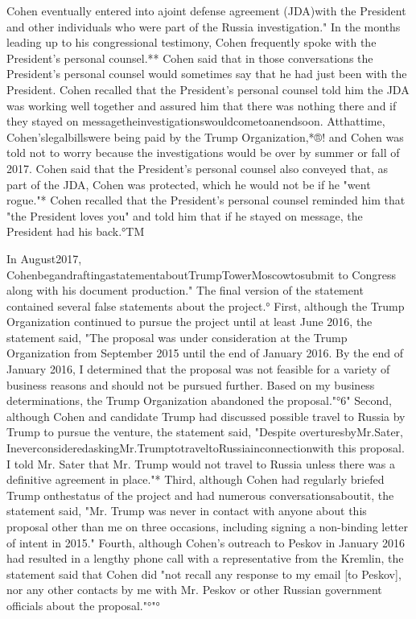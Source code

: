 Cohen eventually entered into ajoint defense agreement (JDA)with the President and other individuals who were part of the Russia investigation."
In the months leading up to his congressional testimony, Cohen frequently spoke with the President's personal counsel.**
Cohen said that in those conversations the President's personal counsel would sometimes say that he had just been with the President.
Cohen recalled that the President's personal counsel told him the JDA was working well together and assured him that there was nothing there and if they stayed on messagetheinvestigationswouldcometoanendsoon.
Atthattime, Cohen'slegalbillswere being paid by the Trump Organization,*®! and Cohen was told not to worry because the investigations would be over by summer or fall of 2017.
Cohen said that the President's personal counsel also conveyed that, as part of the JDA, Cohen was protected, which he would not be if he "went rogue."*
Cohen recalled that the President's personal counsel reminded him that "the President loves you" and told him that if he stayed on message, the President had his back.°TM

In August2017, CohenbegandraftingastatementaboutTrumpTowerMoscowtosubmit to Congress along with his document production."
The final version of the statement contained several false statements about the project.°
First, although the Trump Organization continued to pursue the project until at least June 2016, the statement said, "The proposal was under consideration at the Trump Organization from September 2015 until the end of January 2016.
By the end of January 2016, I determined that the proposal was not feasible for a variety of business reasons and should not be pursued further.
Based on my business determinations, the Trump Organization abandoned the proposal."°6"
Second, although Cohen and candidate Trump had discussed possible travel to Russia by Trump to pursue the venture, the statement said, "Despite overturesbyMr.Sater, IneverconsideredaskingMr.TrumptotraveltoRussiainconnectionwith this proposal.
I told Mr. Sater that Mr. Trump would not travel to Russia unless there was a definitive agreement in place."*
Third, although Cohen had regularly briefed Trump onthestatus of the project and had numerous conversationsaboutit, the statement said, "Mr. Trump was never in contact with anyone about this proposal other than me on three occasions, including signing a non-binding letter of intent in 2015."
Fourth, although Cohen's outreach to Peskov in January 2016 had resulted in a lengthy phone call with a representative from the Kremlin, the statement said that Cohen did "not recall any response to my email [to Peskov], nor any other contacts by me with Mr. Peskov or other Russian government officials about the proposal."°"°

